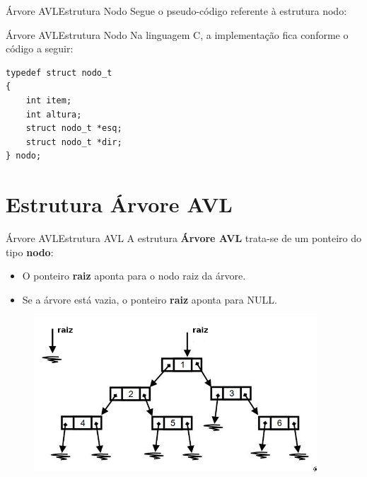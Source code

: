 \documentclass[aspectratio=169]{beamer}
\begin{document}

\begin{frame}[fragile]{Árvore AVL}{Estrutura Nodo}
Segue o pseudo-código referente à estrutura nodo:
\begin{algorithm}[H]
\caption{Nodo} 
\label{Nodo}
\end{algorithm} 
\end{frame}


\begin{frame}[fragile]{Árvore AVL}{Estrutura Nodo}
Na linguagem C, a implementação fica conforme o código a seguir:
\begin{lstlisting}[style=CStyle]
typedef struct nodo_t
{
    int item;
    int altura;
    struct nodo_t *esq;
    struct nodo_t *dir;
} nodo;
\end{lstlisting}  
\end{frame}


\section{Estrutura Árvore AVL}

\begin{frame}{Árvore AVL}{Estrutura AVL}
A estrutura {\bf Árvore AVL} trata-se de um ponteiro do tipo {\bf nodo}:
\begin{itemize}
 \item O ponteiro {\bf raiz} aponta para o nodo raiz da árvore.
 \item Se a árvore está vazia, o ponteiro {\bf raiz} aponta para NULL.
\end{itemize}
\begin{figure}[!h]
  \centering
  \includegraphics[width=300pt]{imagens/estrutura_arvore.png}
  \label{fig_estrutura_arvore}
\end{figure}
\end{frame}
\end{document}
